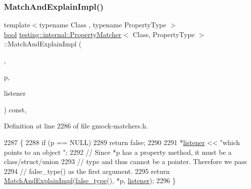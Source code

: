 \mbox{\label{classtesting_1_1internal_1_1PropertyMatcher_a6c8caccbd97d5083c322fc0d8579c2d3}} 
\subsubsection{\texorpdfstring{Match\+And\+Explain\+Impl()}{MatchAndExplainImpl()}\hspace{0.1cm}{\footnotesize\ttfamily [2/2]}}
{\footnotesize\ttfamily template$<$typename Class , typename Property\+Type $>$ \\
\hyperlink{classbool}{bool} \hyperlink{classtesting_1_1internal_1_1PropertyMatcher}{testing\+::internal\+::\+Property\+Matcher}$<$ Class, Property\+Type $>$\+::Match\+And\+Explain\+Impl (\begin{DoxyParamCaption}\item[{\hyperlink{namespacetesting_1_1internal_a62f917c3424d8841de9b49b5ec28edb4}{true\+\_\+type}}]{,  }\item[{const Class $\ast$}]{p,  }\item[{\hyperlink{classtesting_1_1MatchResultListener}{Match\+Result\+Listener} $\ast$}]{listener }\end{DoxyParamCaption}) const\hspace{0.3cm}{\ttfamily [inline]}, {\ttfamily [private]}}



Definition at line 2286 of file gmock-\/matchers.\+h.


\begin{DoxyCode}
2287                                                                 \{
2288     \textcolor{keywordflow}{if} (p == NULL)
2289       \textcolor{keywordflow}{return} \textcolor{keyword}{false};
2290 
2291     *\hyperlink{namespaceinteractive__marker_a0e579ab555212bb5e2c9f8a675b7618a}{listener} << \textcolor{stringliteral}{"which points to an object "};
2292     \textcolor{comment}{// Since *p has a property method, it must be a class/struct/union}
2293     \textcolor{comment}{// type and thus cannot be a pointer.  Therefore we pass}
2294     \textcolor{comment}{// false\_type() as the first argument.}
2295     \textcolor{keywordflow}{return} \hyperlink{classtesting_1_1internal_1_1PropertyMatcher_aee28dd64a2896159661a4f3ad3329ffd}{MatchAndExplainImpl}(\hyperlink{namespacetesting_1_1internal_abb1d0789f19bdde21affccbd1078b525}{false\_type}(), *p, 
      \hyperlink{namespaceinteractive__marker_a0e579ab555212bb5e2c9f8a675b7618a}{listener});
2296   \}
\end{DoxyCode}


